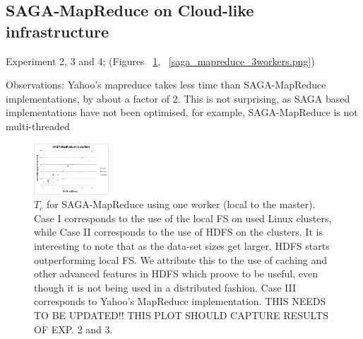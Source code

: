 \documentclass[conference,final]{IEEEtran}
\newcommand{\jhanote}[1]{ {\textcolor{red} { ***SJ: #1 }}}
\newcommand{\jhanote}[1]{}
\newcommand{\sagamapreduce }{SAGA-MapReduce }
\newcommand{\tc }{ $T_c$ }
\begin{document}



\subsection{SAGA-MapReduce on Cloud-like infrastructure}


Experiment 2, 3 and 4; 
(Figures ~\ref{saga_mapreduce_1worker.png}, ~\ref{saga_mapreduce_3workers.png})

Observations: Yahoo's mapreduce takes less time than \sagamapreduce
implementations, by about a factor of 2. This is not surprising, as
SAGA based implementations have not been optimised, for example,
\sagamapreduce is not multi-threaded


\begin{figure}[t]
      \centering
          \includegraphics[width=0.25\textwidth]{saga_mapreduce_1worker.png}
          \caption{\tc for \sagamapreduce using one worker (local to
            the master).  Case I corresponds to the use of the local
            FS on used Linux clusters, while Case II corresponds to
            the use of HDFS on the clusters.  It is interesting to
            note that as the data-set sizes get larger, HDFS starts
            outperforming local FS.  We attribute this to the use of
            caching and other advanced features in HDFS which proove
            to be useful, even though it is not being used in a
            distributed fashion. Case III
            corresponds %
            to Yahoo's MapReduce implementation. THIS NEEDS TO BE
            UPDATED!! THIS PLOT SHOULD CAPTURE RESULTS OF EXP. 2 and
            3.} %

      \label{saga_mapreduce_1worker.png}
\end{figure}
\end{document}
